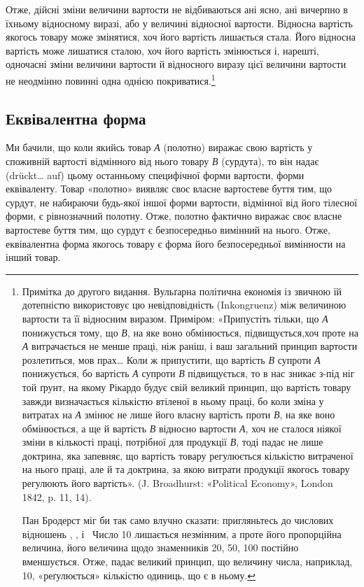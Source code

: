 Отже, дійсні зміни величини вартости не відбиваються ані
ясно, ані вичерпно в їхньому відносному виразі, або у величині
відносної вартости. Відносна вартість якогось товару може змінятися,
хоч його вартість лишається стала. Його відносна вартість
може лишатися сталою, хоч його вартість змінюється і, нарешті,
одночасні зміни величини вартости й відносного виразу
цієї величини вартости не неодмінно повинні одна однією покриватися.\footnote{
Примітка до другого видання. Вульґарна політична економія
із звичною їй дотепністю використовує цю невідповідність (Inkongruenz)
між величиною вартости та її відносним виразом. Приміром: «Припустіть
тільки, що \emph{А} понижується тому, що \emph{В}, на яке воно обмінюється,
підвищується,хоч проте на \emph{А} витрачається не менше праці, ніж раніш, і
ваш загальний принцип вартости розлетиться, мов прах\dots{} Коли ж припустити,
що вартість \emph{В} супроти \emph{А} понижується, бо вартість \emph{А} супроти
\emph{В} підвищується, то в нас зникає з-під ніг той ґрунт, на якому Рікардо
будує свій великий принцип, що вартість товару завжди визначається
кількістю втіленої в ньому праці, бо коли зміна у витратах на \emph{А} змінює
не лише його власну вартість проти \emph{В}, на яке воно обмінюється, а ще й
вартість \emph{В} відносно вартости \emph{А}, хоч не сталося ніякої зміни в
кількості праці, потрібної для продукції \emph{В}, тоді падає не лише доктрина,
яка запевняє, що вартість товару регулюється кількістю витраченої на нього
праці, але й та доктрина, за якою витрати продукції якогось товару регулюють
його вартість». (J. Broadhurst: «Political Economy», London 1842, p. 11, 14).

Пан Бродерст міг би так само влучно сказати: пригляньтесь до числових відношень
, , і~ Число 10 лишається
незмінним, а проте його пропорційна величина, його величина щодо знаменників
20, 50, 100 постійно вменшується. Отже, падає великий принцип, що величину числа,
наприклад, 10, «реґулюється» кількістю одиниць, що є в ньому.
}
\subsection{Еквівалентна форма}

Ми бачили, що коли якийсь товар \emph{А} (полотно) виражає свою вартість у споживній вартості відмінного
від нього товару \emph{В} (сурдута), то він надає (drückt\dots{} auf) цьому останньому специфічної форми
вартости, форми еквіваленту. Товар «полотно» виявляє своє власне вартостеве буття тим, що сурдут, не
набираючи будь-якої іншої форми вартости, відмінної від його тілесної форми, є рівнозначний полотну.
Отже, полотно фактично виражає своє власне вартостеве буття тим, що сурдут є безпосередньо вимінний
на нього. Отже, еквівалентна форма якогось товару є форма його безпосередньої вимінности на інший
товар.

